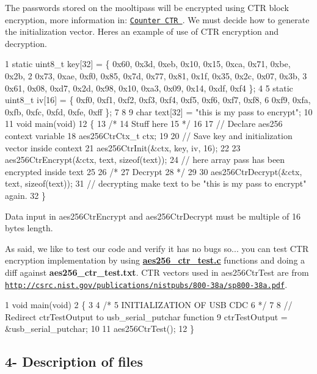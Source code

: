 The passwords stored on the mooltipass will be encrypted using C\+TR block encryption, more information in\+: \href{http://en.wikipedia.org/wiki/Block_cipher_mode_of_operation#Counter_.28CTR.29}{\tt Counter C\+TR }. We must decide how to generate the initialization vector. Here\textquotesingle{}s an example of use of C\+TR encryption and decryption.


\begin{DoxyCode}
1 static uint8\_t key[32] = \{ 0x60, 0x3d, 0xeb, 0x10, 0x15, 0xca, 0x71, 0xbe, 0x2b,
2 0x73, 0xae, 0xf0, 0x85, 0x7d, 0x77, 0x81, 0x1f, 0x35, 0x2c, 0x07, 0x3b,
3 0x61, 0x08, 0xd7, 0x2d, 0x98, 0x10, 0xa3, 0x09, 0x14, 0xdf, 0xf4 \};
4 
5 static uint8\_t iv[16] = \{ 0xf0, 0xf1, 0xf2, 0xf3, 0xf4, 0xf5, 0xf6, 0xf7, 0xf8,
6 0xf9, 0xfa, 0xfb, 0xfc, 0xfd, 0xfe, 0xff \};
7 
8 
9 char text[32] = "this is my pass to encrypt";
10 
11 void main(void)
12 \{
13     /*
14         Stuff here
15     */
16 
17     // Declare aes256 context variable
18     aes256CtrCtx\_t ctx;
19 
20     // Save key and initialization vector inside context
21     aes256CtrInit(&ctx, key, iv, 16);
22 
23     aes256CtrEncrypt(&ctx, text, sizeof(text));
24     // here array pass has been encrypted inside text
25 
26     /*
27         Decrypt
28     */
29 
30     aes256CtrDecrypt(&ctx, text, sizeof(text));
31     // decrypting make text to be "this is my pass to encrypt" again.
32 \}
\end{DoxyCode}
 Data input in aes256\+Ctr\+Encrypt and aes256\+Ctr\+Decrypt must be multiple of 16 bytes length.

As said, we like to test our code and verify it has no bugs so... you can test C\+TR encryption implementation by using {\bfseries \hyperlink{aes256__ctr__test_8c}{aes256\+\_\+ctr\+\_\+test.\+c}} functions and doing a diff against {\bfseries aes256\+\_\+ctr\+\_\+test.\+txt}. C\+TR vectors used in aes256\+Ctr\+Test are from \href{http://csrc.nist.gov/publications/nistpubs/800-38a/sp800-38a.pdf}{\tt http\+://csrc.\+nist.\+gov/publications/nistpubs/800-\/38a/sp800-\/38a.\+pdf}. 
\begin{DoxyCode}
1 void main(void)
2 \{
3 
4     /*
5         INITIALIZATION OF USB CDC
6     */
7 
8     // Redirect ctrTestOutput to usb\_serial\_putchar function
9     ctrTestOutput = &usb\_serial\_putchar;
10 
11     aes256CtrTest();
12 \}
\end{DoxyCode}


\subsection*{4-\/ Description of files }


